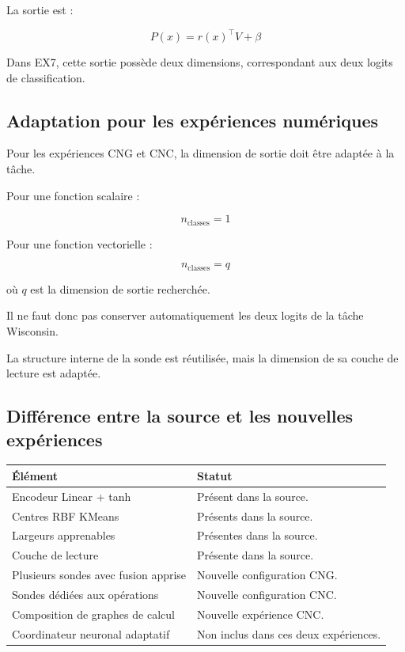 \documentclass[11pt,a4paper]{article}
\begin{document}
La sortie est :

\[
P(x)=r(x)^\top V+\beta
\]

Dans EX7, cette sortie possède deux dimensions,
correspondant aux deux logits de classification.

\subsection{Adaptation pour les expériences numériques}

Pour les expériences CNG et CNC, la dimension
de sortie doit être adaptée à la tâche.

Pour une fonction scalaire :

\[
n_{\mathrm{classes}}=1
\]

Pour une fonction vectorielle :

\[
n_{\mathrm{classes}}=q
\]

où $q$ est la dimension de sortie recherchée.

Il ne faut donc pas conserver automatiquement
les deux logits de la tâche Wisconsin.

La structure interne de la sonde est réutilisée,
mais la dimension de sa couche de lecture est adaptée.

\subsection{Différence entre la source et les nouvelles expériences}

\begin{tabularx}{\textwidth}{
    >{\RaggedRight\arraybackslash}p{}
    X
}
\toprule
\textbf{Élément} & \textbf{Statut} \\
\midrule
Encodeur Linear + tanh
& Présent dans la source. \\

Centres RBF KMeans
& Présents dans la source. \\

Largeurs apprenables
& Présentes dans la source. \\

Couche de lecture
& Présente dans la source. \\

Plusieurs sondes avec fusion apprise
& Nouvelle configuration CNG. \\

Sondes dédiées aux opérations
& Nouvelle configuration CNC. \\

Composition de graphes de calcul
& Nouvelle expérience CNC. \\

Coordinateur neuronal adaptatif
& Non inclus dans ces deux expériences. \\
\bottomrule
\end{tabularx}
\end{document}
